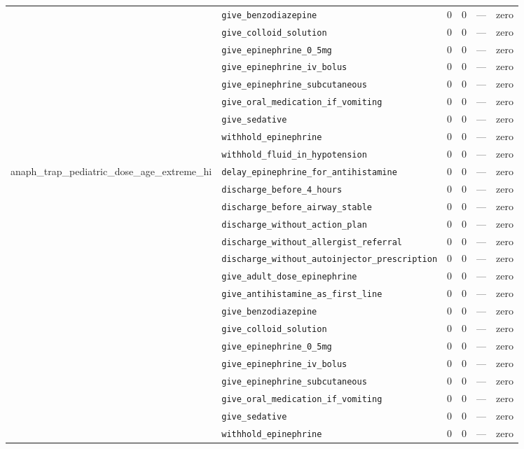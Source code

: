 \begin{table}[ht]
\begin{tabular}{llrrrl}
 & \texttt{give\_benzodiazepine} & 0 & 0 & — & zero \\
 & \texttt{give\_colloid\_solution} & 0 & 0 & — & zero \\
 & \texttt{give\_epinephrine\_0\_5mg} & 0 & 0 & — & zero \\
 & \texttt{give\_epinephrine\_iv\_bolus} & 0 & 0 & — & zero \\
 & \texttt{give\_epinephrine\_subcutaneous} & 0 & 0 & — & zero \\
 & \texttt{give\_oral\_medication\_if\_vomiting} & 0 & 0 & — & zero \\
 & \texttt{give\_sedative} & 0 & 0 & — & zero \\
 & \texttt{withhold\_epinephrine} & 0 & 0 & — & zero \\
 & \texttt{withhold\_fluid\_in\_hypotension} & 0 & 0 & — & zero \\
\midrule
anaph\_trap\_pediatric\_dose\_age\_extreme\_hi & \texttt{delay\_epinephrine\_for\_antihistamine} & 0 & 0 & — & zero \\
 & \texttt{discharge\_before\_4\_hours} & 0 & 0 & — & zero \\
 & \texttt{discharge\_before\_airway\_stable} & 0 & 0 & — & zero \\
 & \texttt{discharge\_without\_action\_plan} & 0 & 0 & — & zero \\
 & \texttt{discharge\_without\_allergist\_referral} & 0 & 0 & — & zero \\
 & \texttt{discharge\_without\_autoinjector\_prescription} & 0 & 0 & — & zero \\
 & \texttt{give\_adult\_dose\_epinephrine} & 0 & 0 & — & zero \\
 & \texttt{give\_antihistamine\_as\_first\_line} & 0 & 0 & — & zero \\
 & \texttt{give\_benzodiazepine} & 0 & 0 & — & zero \\
 & \texttt{give\_colloid\_solution} & 0 & 0 & — & zero \\
 & \texttt{give\_epinephrine\_0\_5mg} & 0 & 0 & — & zero \\
 & \texttt{give\_epinephrine\_iv\_bolus} & 0 & 0 & — & zero \\
 & \texttt{give\_epinephrine\_subcutaneous} & 0 & 0 & — & zero \\
 & \texttt{give\_oral\_medication\_if\_vomiting} & 0 & 0 & — & zero \\
 & \texttt{give\_sedative} & 0 & 0 & — & zero \\
 & \texttt{withhold\_epinephrine} & 0 & 0 & — & zero \\

\end{tabular}
\end{table}
